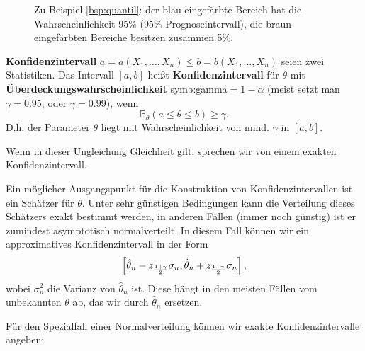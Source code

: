\begin{figure}
    \centering
    \begin{tikzpicture}
    \end{tikzpicture}
    \caption{Zu Beispiel \ref{bsp:quantil}: der blau eingefärbte Bereich hat die Wahrscheinlichkeit 95\% (95\% Prognoseintervall), die braun eingefärbten Bereiche besitzen zusammen 5\%.}
    \label{fig:quantil}
\end{figure}

\begin{definition} \textbf{Konfidenzintervall}\label{def:konfidenzintervall}
$a=a(X_1,\dots,X_n)\le b=b(X_1,\dots,X_n)$ seien zwei Statistiken. Das
Intervall
$[a,b]$ heißt \textbf{Konfidenzintervall} für $\theta$ mit \textbf{Überdeckungswahrscheinlichkeit} \gls{symb:gamma}$=1-\alpha$ (meist setzt man $\gamma=0.95$, oder $\gamma=0.99$), wenn
\[\mathbb P_\theta(a\le \theta \le b)\ge\gamma.\]
D.h. der Parameter $\theta$ liegt mit Wahrscheinlichkeit von mind. $\gamma$ in $[a,b]$.

Wenn in dieser Ungleichung Gleichheit gilt, sprechen wir von einem
exakten Konfidenzintervall.
\end{definition}



Ein möglicher Ausgangspunkt für die Konstruktion von Konfidenzintervallen
 ist ein Schätzer für $\theta$. Unter sehr günstigen Bedingungen
kann die Verteilung dieses Schätzers exakt bestimmt werden, in anderen
Fällen (immer noch günstig) ist er zumindest asymptotisch
normalverteilt. In diesem Fall können wir ein approximatives Konfidenzintervall in der Form
\[\left[\hat\theta_n-z_{1+\gamma\over 2}\sigma_n,
\hat\theta_n+z_{1+\gamma\over 2}\sigma_n\right],\]
wobei $\sigma_n^2$ die Varianz von $\hat\theta_n$ ist.
Diese hängt in den meisten Fällen vom unbekannten $\theta$ ab, das wir
durch $\hat\theta_n$ ersetzen.


Für den Spezialfall einer Normalverteilung können wir exakte
Konfidenzintervalle angeben:

